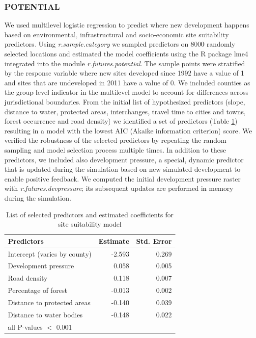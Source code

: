\documentclass{isprs}
\begin{document}
\subsubsection{POTENTIAL}
We used multilevel logistic regression to predict
where new development happens based on
environmental, infrastructural and socio-economic site suitability
predictors. 
Using \emph{r.sample.category} we sampled predictors on 8000 
randomly selected locations and estimated the model coefficients
using the R package lme4 integrated into the module \emph{r.futures.potential}.
The sample points were stratified by the response variable
where new sites developed since 1992 have a value of 1
and sites that are undeveloped in 2011 have a value of 0.
We included counties as the group level indicator
in the multilevel model to account for differences
across jurisdictional boundaries.
From the initial list of hypothesized predictors
(slope, distance to water, protected areas, interchanges,
travel time to cities and towns, forest occurrence and road density)
we identified a set of predictors (Table \ref{tab:predictors})
resulting in a model with the lowest AIC (Akaike information criterion) score.
We verified the robustness of the selected predictors
by repeating the random sampling and model selection process multiple times.
In addition to these predictors, we included also development pressure,
 a special, dynamic predictor that is
 updated during the simulation based on new simulated development to enable positive feedback.
We computed the initial development pressure raster
with \emph{r.futures.devpressure}; its subsequent updates are performed in memory during the simulation.

\begin{table}[htb]
 \centering
\begin{center}
\begin{tabular}{lrr}
\toprule
Predictors & Estimate{\scriptsize *} & Std. Error \\ \midrule
Intercept (varies by county) & -2.593 & 0.269\\
Development pressure & 0.058 & 0.005\\
Road density & 0.118 & 0.007\\
Percentage of forest & -0.013 & 0.002 \\
Distance to protected areas & -0.140 & 0.039\\
Distance to water bodies & -0.148 & 0.022\\
\bottomrule
{\scriptsize * all P-values $<$ 0.001}
\end{tabular}
\end{center}
 \caption{List of selected predictors and estimated coefficients
 for site suitability model}
 \label{tab:predictors}
\end{table}
\end{document}
